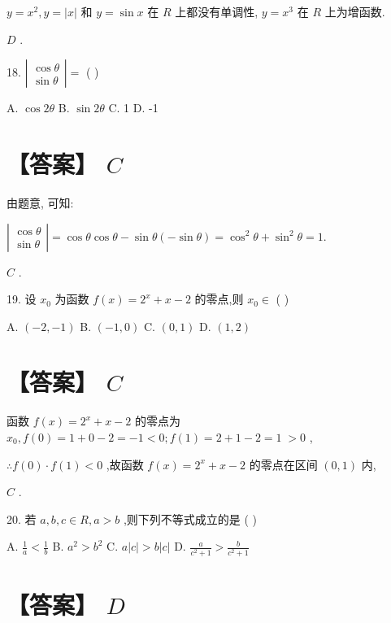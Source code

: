\documentclass[10pt]{article}
\begin{document}
\(y = {x}^{2},y = \left| x\right|\) 和 \(y = \sin x\) 在 \(R\) 上都没有单调性, \(y = {x}^{3}\) 在 \(R\) 上为增函数.

\(D\) .

18. \(\left| \begin{array}{l} \cos \theta \\  \sin \theta  \end{array}\right|  =\) ( )

A. \(\cos {2\theta }\) B. \(\sin {2\theta }\) C. 1 D. -1

\section*{【答案】 \(C\)}

由题意, 可知:

\(\left| \begin{array}{l} \cos \theta \\  \sin \theta  \end{array}\right|  = \cos \theta \cos \theta  - \sin \theta \left( {-\sin \theta }\right)  = {\cos }^{2}\theta  + {\sin }^{2}\theta  = 1.\)

\(C\) .

19. 设 \({x}_{0}\) 为函数 \(f\left( x\right)  = {2}^{x} + x - 2\) 的零点,则 \({x}_{0} \in\) ( )

A. \(\left( {-2, - 1}\right)\) B. \(\left( {-1,0}\right)\) C. \(\left( {0,1}\right)\) D. \(\left( {1,2}\right)\)

\section*{【答案】 \(C\)}

函数 \(f\left( x\right)  = {2}^{x} + x - 2\) 的零点为 \({x}_{0},f\left( 0\right)  = 1 + 0 - 2 =  - 1 < 0;f\left( 1\right)  = 2 + 1 - 2 = 1 \; > 0\) ,

\(\therefore f\left( 0\right)  \cdot  f\left( 1\right)  < 0\) ,故函数 \(f\left( x\right)  = {2}^{x} + x - 2\) 的零点在区间 \(\left( {0,1}\right)\) 内,

\(C\) .

20. 若 \(a,b,c \in  R,a > b\) ,则下列不等式成立的是 ( )

A. \(\frac{1}{a} < \frac{1}{b}\) B. \({a}^{2} > {b}^{2}\) C. \(a\left| c\right|  > b\left| c\right|\) D. \(\frac{a}{{c}^{2} + 1} > \frac{b}{{c}^{2} + 1}\)

\section*{【答案】 \(D\)}
\end{document}
